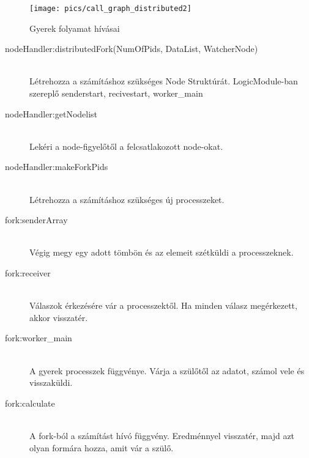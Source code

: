 	\begin{figure}[h]
		\texttt{[image: pics/call\_graph\_distributed2]}
		\centering
		\caption{Gyerek folyamat hívásai\label{fig:call_graph_distributed2}}
	\end{figure}
	
	\begin{description}
		\item[nodeHandler:distributedFork(NumOfPids, DataList, WatcherNode)]
		\hfill \\
		Létrehozza a számításhoz szükséges Node Struktúrát.
		LogicModule-ban szereplő senderstart, recivestart, worker\_main 
		\item[nodeHandler:getNodelist]
		\hfill \\
		Lekéri a node-figyelőtől a felcsatlakozott node-okat.
		\item[nodeHandler:makeForkPids]
		\hfill \\
		Létrehozza a számításhoz szükséges új processzeket.

		\item[fork:senderArray]
		\hfill \\ 
			Végig megy egy adott tömbön és az elemeit szétküldi a processzeknek. 
		\item[fork:receiver]
		\hfill \\
			Válaszok érkezésére vár a processzektől. Ha minden válasz megérkezett, akkor visszatér.
		\item[fork:worker\_main]
		\hfill \\
			A gyerek processzek függvénye. Várja a szülőtől az adatot, számol vele és visszaküldi.
		\item[fork:calculate]
		\hfill \\ 
			A fork-ból a számítást hívó függvény. Eredménnyel visszatér, majd azt olyan formára hozza, amit vár a szülő. 
	\end{description}